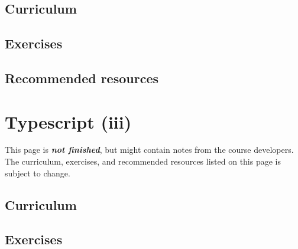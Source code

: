 \documentclass[
  letterpaper,
  DIV=11,
  numbers=noendperiod]{scrreprt}
\begin{document}
\hypertarget{curriculum-8}{%
\section{Curriculum}\label{curriculum-8}}

\hypertarget{exercises-3}{%
\section{Exercises}\label{exercises-3}}

\hypertarget{recommended-resources-6}{%
\section{Recommended resources}\label{recommended-resources-6}}


\hypertarget{typescript-iii}{%
\chapter{Typescript (iii)}\label{typescript-iii}}

\begin{tcolorbox}[enhanced jigsaw, colbacktitle=quarto-callout-important-color!10!white, bottomrule=.15mm, toprule=.15mm, colback=white, coltitle=black, bottomtitle=1mm, colframe=quarto-callout-important-color-frame, opacitybacktitle=0.6, titlerule=0mm, left=2mm, title=\textcolor{quarto-callout-important-color}{\faExclamation}\hspace{0.5em}{Important}, opacityback=0, arc=.35mm, leftrule=.75mm, rightrule=.15mm, toptitle=1mm, breakable]

This page is \textbf{\emph{not finished}}, but might contain notes from
the course developers. The curriculum, exercises, and recommended
resources listed on this page is subject to change.

\end{tcolorbox}

\hypertarget{curriculum-9}{%
\section{Curriculum}\label{curriculum-9}}

\hypertarget{exercises-4}{%
\section{Exercises}\label{exercises-4}}
\end{document}
